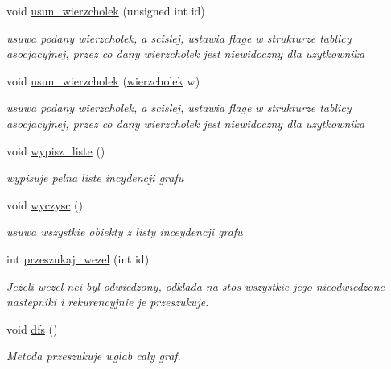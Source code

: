 \begin{DoxyCompactItemize}
void \hyperlink{classgraf_a867f6b80702573ceea8dca8739bf93d8}{usun\-\_\-wierzcholek} (unsigned int id)
\begin{DoxyCompactList}\small\item\em usuwa podany wierzcholek, a scislej, ustawia flage w strukturze tablicy asocjacyjnej, przez co dany wierzcholek jest niewidoczny dla uzytkownika \end{DoxyCompactList}\item 
void \hyperlink{classgraf_a970f1f2c7883eb466a59567e81467cfe}{usun\-\_\-wierzcholek} (\hyperlink{classwierzcholek}{wierzcholek} w)
\begin{DoxyCompactList}\small\item\em usuwa podany wierzcholek, a scislej, ustawia flage w strukturze tablicy asocjacyjnej, przez co dany wierzcholek jest niewidoczny dla uzytkownika \end{DoxyCompactList}\item 
void \hyperlink{classgraf_aa4376c1891e93cac64f1b53548af8b11}{wypisz\-\_\-liste} ()
\begin{DoxyCompactList}\small\item\em wypisuje pelna liste incydencji grafu \end{DoxyCompactList}\item 
void \hyperlink{classgraf_a0aec2013836977402dc75e4c5931f09d}{wyczysc} ()
\begin{DoxyCompactList}\small\item\em usuwa wszystkie obiekty z listy inceydencji grafu \end{DoxyCompactList}\item 
int \hyperlink{classgraf_a6f53eff4c615bc5e89371e9a9e221b31}{przeszukaj\-\_\-wezel} (int id)
\begin{DoxyCompactList}\small\item\em \-Jeżeli wezel nei byl odwiedzony, odklada na stos wszystkie jego nieodwiedzone nastepniki i rekurencyjnie je przeszukuje. \end{DoxyCompactList}\item 
void \hyperlink{classgraf_afe45945e964407a08e059aacff043d2e}{dfs} ()
\begin{DoxyCompactList}\small\item\em \-Metoda przeszukuje wglab caly graf. \end{DoxyCompactList}\end{DoxyCompactItemize}
